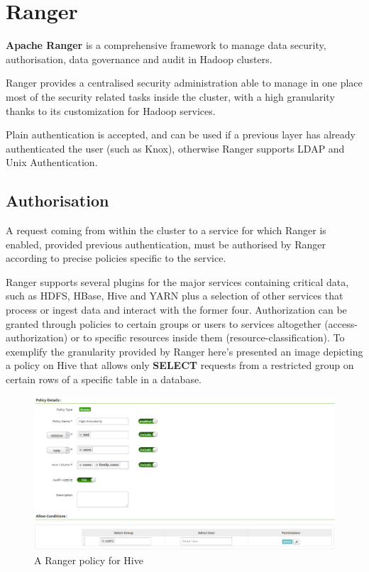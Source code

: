 \section{Ranger}

\textbf{Apache Ranger} \cite{ranger_doc}is a comprehensive framework to manage data security, authorisation, data governance and audit in Hadoop clusters.

Ranger provides a centralised security administration able to manage in one place most of the security related tasks inside the cluster, with a high granularity thanks to its customization for Hadoop services.

Plain authentication is accepted, and can be used if a previous layer has already authenticated the user (such as Knox), otherwise Ranger supports LDAP and Unix Authentication.

\subsection{Authorisation}
A request coming from within the cluster to a service for which Ranger is enabled, provided previous authentication, must be authorised by Ranger according to precise policies specific to the service.

Ranger supports several plugins for the major services containing critical data, such as HDFS, HBase, Hive and YARN plus a selection of other services that process or ingest data and interact with the former four.
\newline Authorization can be granted through policies to certain groups or users to services altogether (access-authorization) or to specific resources inside them (resource-classification).
\newline
To exemplify the granularity provided by Ranger here's presented an image depicting a policy on Hive that allows only \textbf{SELECT} requests from a restricted group on certain rows of a specific table in a database.

\begin{figure}
	\centering
	\includegraphics[scale=0.5]{Figures/policy.png}
	\decoRule
	\caption[Infrastructural Stack]{A Ranger policy for Hive}
	\label{fig:Policy}
\end{figure}


